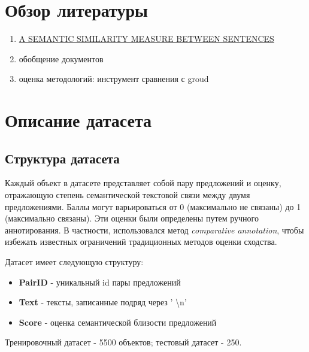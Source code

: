 \documentclass[12pt]{article}
\begin{document}
\newpage

\section{Обзор литературы}

 \begin{enumerate}
	\item  \href{https://www.researchgate.net/publication/272088094_A_SEMANTIC_SIMILARITY_MEASURE_BETWEEN_SENTENCES}{A SEMANTIC SIMILARITY MEASURE BETWEEN SENTENCES}
	
	
	\item обобщение документов
	\item оценка методологий: инструмент сравнения с groud
\end{enumerate}



\newpage

\section{Описание датасета}
\subsection{Структура датасета}
Каждый объект в датасете представляет собой пару предложений и оценку, отражающую степень семантической текстовой связи между двумя предложениями. Баллы могут варьироваться от 0 (максимально не связаны) до 1 (максимально связаны). Эти оценки были определены путем ручного аннотирования. В частности, использовался метод \textit{comparative annotation}, чтобы избежать известных ограничений традиционных методов оценки сходства.

Датасет имеет следующую структуру:
\begin{itemize}
    \item \textbf{PairID} - уникальный id пары предложений
    \item \textbf{Text} - тексты, записанные подряд через ' \textbackslash n'
    \item \textbf{Score} - оценка семантической близости предложений
\end{itemize}

Тренировочный датасет - 5500 объектов; тестовый датасет - 250.
\end{document}
